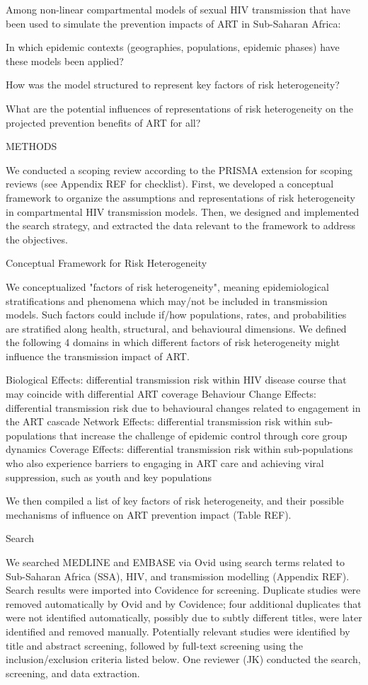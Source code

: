 Among non-linear compartmental models of sexual HIV transmission
that have been used to simulate the prevention impacts of ART in Sub-Saharan Africa:

      In which epidemic contexts (geographies, populations, epidemic phases)
      have these models been applied?

      How was the model structured to represent key factors of risk heterogeneity?

      What are the potential influences of representations of risk heterogeneity
      on the projected prevention benefits of ART for all?

METHODS

We conducted a scoping review according to the PRISMA extension for scoping reviews
(see Appendix REF for checklist).
First, we developed a conceptual framework to organize
the assumptions and representations of risk heterogeneity
in compartmental HIV transmission models.
Then, we designed and implemented the search strategy,
and extracted the data relevant to the framework
to address the objectives.

Conceptual Framework for Risk Heterogeneity

We conceptualized "factors of risk heterogeneity", meaning
epidemiological stratifications and phenomena which may/not be included in transmission models.
Such factors could include if/how populations, rates, and probabilities
are stratified along health, structural, and behavioural dimensions.
We defined the following 4 domains in which
different factors of risk heterogeneity might influence the transmission impact of ART.

   Biological Effects:
  differential transmission risk within HIV disease course
  that may coincide with differential ART coverage
   Behaviour Change Effects:
  differential transmission risk due to
  behavioural changes related to engagement in the ART cascade
   Network Effects:
  differential transmission risk within sub-populations
  that increase the challenge of epidemic control through core group dynamics
   Coverage Effects:
  differential transmission risk within sub-populations
  who also experience barriers to engaging in ART care and achieving viral suppression,
  such as youth and key populations

We then compiled a list of key factors of risk heterogeneity,
and their possible mechanisms of influence on ART prevention impact (Table REF).

Search

We searched MEDLINE and EMBASE via Ovid
using search terms related to Sub-Saharan Africa (SSA), HIV, and transmission modelling
(Appendix REF).
Search results were imported into Covidence for screening.
Duplicate studies were removed automatically by Ovid and by Covidence;
four additional duplicates that were not identified automatically,
possibly due to subtly different titles, were later identified and removed manually.
Potentially relevant studies were identified by title and abstract screening, followed 
by full-text screening using the inclusion/exclusion criteria listed below. 
One reviewer (JK) conducted the search, screening, and data extraction.

